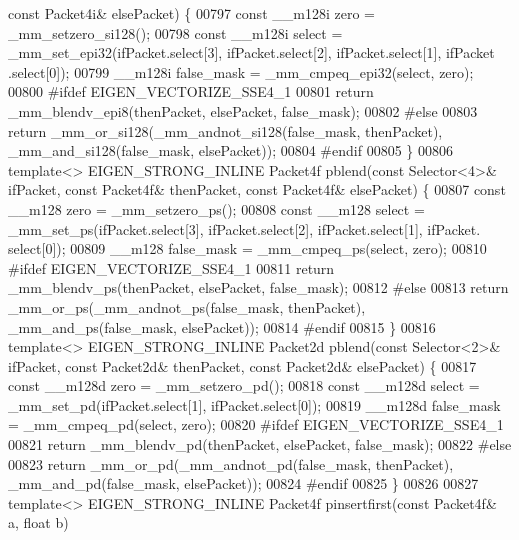 \begin{DoxyCode}
{{{      const} Packet4i& elsePacket) \{
00797   \textcolor{keyword}{const} \_\_m128i zero = \_mm\_setzero\_si128();
00798   \textcolor{keyword}{const} \_\_m128i select = \_mm\_set\_epi32(ifPacket.select[3], ifPacket.select[2], ifPacket.select[1], ifPacket
      .select[0]);
00799   \_\_m128i false\_mask = \_mm\_cmpeq\_epi32(select, zero);
00800 \textcolor{preprocessor}{#ifdef EIGEN\_VECTORIZE\_SSE4\_1}
00801   \textcolor{keywordflow}{return} \_mm\_blendv\_epi8(thenPacket, elsePacket, false\_mask);
00802 \textcolor{preprocessor}{#else}
00803   \textcolor{keywordflow}{return} \_mm\_or\_si128(\_mm\_andnot\_si128(false\_mask, thenPacket), \_mm\_and\_si128(false\_mask, elsePacket));
00804 \textcolor{preprocessor}{#endif}
00805 \}
00806 \textcolor{keyword}{template}<> EIGEN\_STRONG\_INLINE Packet4f pblend(\textcolor{keyword}{const} Selector<4>& ifPacket, \textcolor{keyword}{const} Packet4f& thenPacket, \textcolor{keyword}{
      const} Packet4f& elsePacket) \{
00807   \textcolor{keyword}{const} \_\_m128 zero = \_mm\_setzero\_ps();
00808   \textcolor{keyword}{const} \_\_m128 select = \_mm\_set\_ps(ifPacket.select[3], ifPacket.select[2], ifPacket.select[1], ifPacket.
      select[0]);
00809   \_\_m128 false\_mask = \_mm\_cmpeq\_ps(select, zero);
00810 \textcolor{preprocessor}{#ifdef EIGEN\_VECTORIZE\_SSE4\_1}
00811   \textcolor{keywordflow}{return} \_mm\_blendv\_ps(thenPacket, elsePacket, false\_mask);
00812 \textcolor{preprocessor}{#else}
00813   \textcolor{keywordflow}{return} \_mm\_or\_ps(\_mm\_andnot\_ps(false\_mask, thenPacket), \_mm\_and\_ps(false\_mask, elsePacket));
00814 \textcolor{preprocessor}{#endif}
00815 \}
00816 \textcolor{keyword}{template}<> EIGEN\_STRONG\_INLINE Packet2d pblend(\textcolor{keyword}{const} Selector<2>& ifPacket, \textcolor{keyword}{const} Packet2d& thenPacket, \textcolor{keyword}{
      const} Packet2d& elsePacket) \{
00817   \textcolor{keyword}{const} \_\_m128d zero = \_mm\_setzero\_pd();
00818   \textcolor{keyword}{const} \_\_m128d select = \_mm\_set\_pd(ifPacket.select[1], ifPacket.select[0]);
00819   \_\_m128d false\_mask = \_mm\_cmpeq\_pd(select, zero);
00820 \textcolor{preprocessor}{#ifdef EIGEN\_VECTORIZE\_SSE4\_1}
00821   \textcolor{keywordflow}{return} \_mm\_blendv\_pd(thenPacket, elsePacket, false\_mask);
00822 \textcolor{preprocessor}{#else}
00823   \textcolor{keywordflow}{return} \_mm\_or\_pd(\_mm\_andnot\_pd(false\_mask, thenPacket), \_mm\_and\_pd(false\_mask, elsePacket));
00824 \textcolor{preprocessor}{#endif}
00825 \}
00826 
00827 \textcolor{keyword}{template}<> EIGEN\_STRONG\_INLINE Packet4f pinsertfirst(\textcolor{keyword}{const} Packet4f& a, \textcolor{keywordtype}{float} b)
}}
\end{DoxyCode}
